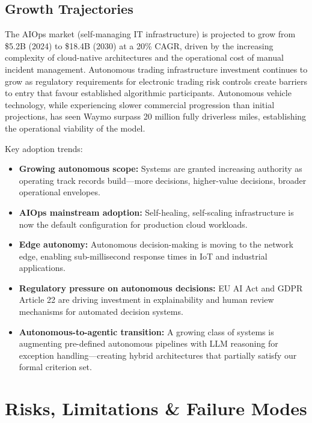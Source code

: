\documentclass[12pt, a4paper]{article}
\begin{document}
\subsection{Growth Trajectories}
The AIOps market (self-managing IT infrastructure) is projected to grow from \$5.2B (2024) to \$18.4B (2030) at a 20\% CAGR, driven by the increasing complexity of cloud-native architectures and the operational cost of manual incident management. Autonomous trading infrastructure investment continues to grow as regulatory requirements for electronic trading risk controls create barriers to entry that favour established algorithmic participants. Autonomous vehicle technology, while experiencing slower commercial progression than initial projections, has seen Waymo surpass 20 million fully driverless miles, establishing the operational viability of the model.

Key adoption trends:
\begin{itemize}
    \item \textbf{Growing autonomous scope:} Systems are granted increasing authority as operating track records build---more decisions, higher-value decisions, broader operational envelopes.
    \item \textbf{AIOps mainstream adoption:} Self-healing, self-scaling infrastructure is now the default configuration for production cloud workloads.
    \item \textbf{Edge autonomy:} Autonomous decision-making is moving to the network edge, enabling sub-millisecond response times in IoT and industrial applications.
    \item \textbf{Regulatory pressure on autonomous decisions:} EU AI Act and GDPR Article 22 are driving investment in explainability and human review mechanisms for automated decision systems.
    \item \textbf{Autonomous-to-agentic transition:} A growing class of systems is augmenting pre-defined autonomous pipelines with LLM reasoning for exception handling---creating hybrid architectures that partially satisfy our formal criterion set.
\end{itemize}

\section{Risks, Limitations \& Failure Modes}\label{sec:risks}
\end{document}
